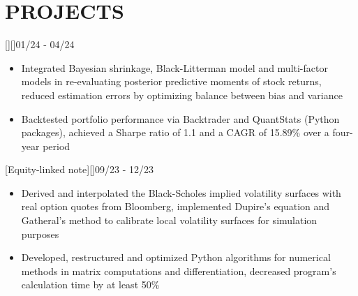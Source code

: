 \documentclass[cmu]{resume}
\begin{document}

    \section{PROJECTS}
    [][]{01/24 - 04/24}
    \begin{itemize}
        \item Integrated Bayesian shrinkage, Black-Litterman model and multi-factor models in re-evaluating posterior predictive moments of stock returns, reduced estimation errors by optimizing balance between bias and variance
        \item Backtested portfolio performance via Backtrader and QuantStats (Python packages), achieved a Sharpe ratio of 1.1 and a CAGR of 15.89\% over a four-year period
    \end{itemize}

    [Equity-linked note][]{09/23 - 12/23}
    \begin{itemize}
        \item Derived and interpolated the Black-Scholes implied volatility surfaces with real option quotes from Bloomberg, implemented Dupire's equation and Gatheral's method to calibrate local volatility surfaces for simulation purposes
        \item Developed, restructured and optimized Python algorithms for numerical methods in matrix computations and differentiation, decreased program's calculation time by at least 50\%
    \end{itemize}

\end{document}
